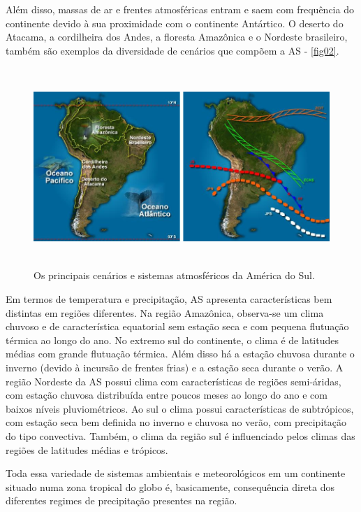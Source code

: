 Além disso, massas de ar e frentes atmosféricas entram e saem com frequência do continente devido à sua proximidade com o continente Antártico. O deserto do Atacama, a cordilheira dos Andes, a floresta Amazônica e o Nordeste brasileiro, também são exemplos da diversidade de cenários que compõem a AS - \autoref{fig02}.

\begin{figure}[!hbp]
\centering
\includegraphics[height=7.5cm]{./figs/fig02.png}
\caption{Os principais cenários e sistemas atmosféricos da América do Sul.}
\label{fig02}
\end{figure}

Em termos de temperatura e precipitação, AS apresenta características bem distintas em regiões diferentes. Na região Amazônica, observa-se um clima chuvoso e de característica equatorial sem estação seca e com pequena flutuação térmica ao longo do ano. No extremo sul do continente, o clima é de latitudes médias com grande flutuação térmica. Além disso há a estação chuvosa durante o inverno (\-de\-vi\-do à incursão de frentes frias) e a estação seca durante o verão. A região Nordeste da AS possui clima com características de regiões semi-áridas, com estação chuvosa distribuída entre poucos meses ao longo do ano e com baixos níveis pluviométricos. Ao sul o clima possui características de subtrópicos, com estação seca bem definida no inverno e chuvosa no verão, com precipitação do tipo convectiva. Também, o clima da região sul é influenciado pelos climas das regiões de latitudes médias e trópicos.

Toda essa variedade de sistemas ambientais e meteorológicos em um continente situado numa zona tropical do globo é, basicamente, consequência direta dos diferentes regimes de precipitação presentes na região. 

